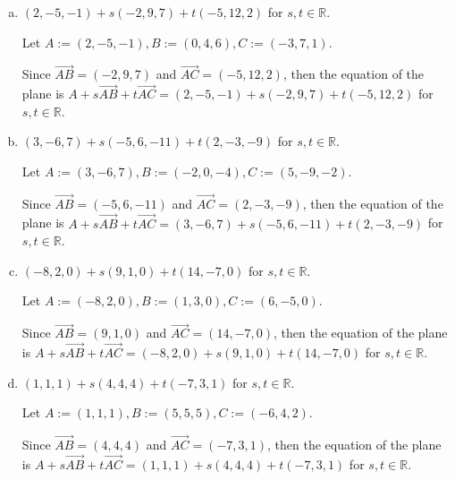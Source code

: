 \begin{Exercise}
\begin{enumerate}[(a)]
\item 
\begin{answer}
$(2,-5,-1)+s(-2,9,7)+t(-5,12,2)$ for $s,t\in\mathbb{R}$.
\end{answer}
\begin{solution}
Let $A := (2,-5,-1), B := (0,4,6), C := (-3,7,1)$.

Since $\overrightarrow{AB} = (-2,9,7)$ and $\overrightarrow{AC} = (-5,12,2)$, then the equation of the plane is $A+s\overrightarrow{AB}+t\overrightarrow{AC} = (2,-5,-1)+s(-2,9,7)+t(-5,12,2)$ for $s,t\in\mathbb{R}$.
\end{solution}

\item 
\begin{answer}
$(3,-6,7)+s(-5,6,-11)+t(2,-3,-9)$ for $s,t\in\mathbb{R}$.
\end{answer}
\begin{solution}
Let $A := (3,-6,7), B := (-2,0,-4), C := (5,-9,-2)$.

Since $\overrightarrow{AB} = (-5,6,-11)$ and $\overrightarrow{AC} = (2,-3,-9)$, then the equation of the plane is $A+s\overrightarrow{AB}+t\overrightarrow{AC} = (3,-6,7)+s(-5,6,-11)+t(2,-3,-9)$ for $s,t\in\mathbb{R}$.
\end{solution}

\item 
\begin{answer}
$(-8,2,0)+s(9,1,0)+t(14,-7,0)$ for $s,t\in\mathbb{R}$.
\end{answer}
\begin{solution}
Let $A := (-8,2,0), B := (1,3,0), C := (6,-5,0)$.

Since $\overrightarrow{AB} = (9,1,0)$ and $\overrightarrow{AC} = (14,-7,0)$, then the equation of the plane is $A+s\overrightarrow{AB}+t\overrightarrow{AC} = (-8,2,0)+s(9,1,0)+t(14,-7,0)$ for $s,t\in\mathbb{R}$.
\end{solution}

\item 
\begin{answer}
$(1,1,1)+s(4,4,4)+t(-7,3,1)$ for $s,t\in\mathbb{R}$.
\end{answer}
\begin{solution}
Let $A := (1,1,1), B := (5,5,5), C := (-6,4,2)$.

Since $\overrightarrow{AB} = (4,4,4)$ and $\overrightarrow{AC} = (-7,3,1)$, then the equation of the plane is $A+s\overrightarrow{AB}+t\overrightarrow{AC} = (1,1,1)+s(4,4,4)+t(-7,3,1)$ for $s,t\in\mathbb{R}$.
\end{solution}
\end{enumerate}
\end{Exercise}